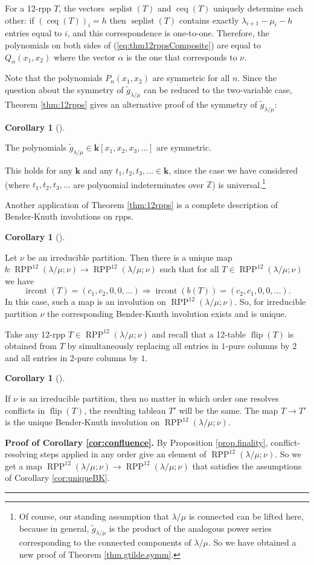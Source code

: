 \documentclass[numbers=enddot,12pt,final,onecolumn,notitlepage]{scrartcl}%
\theoremstyle{definition}
\newtheorem{coro}[theo]{Corollary}
\newenvironment{corollary}[1][]
{\begin{coro}[#1]\begin{leftbar}}
{\end{leftbar}\end{coro}}
\newenvironment{proof}[1][Proof]{\noindent\textbf{#1.} }{\ \rule{0.5em}{0.5em}}
\newcommand{\kk}{\mathbf{k}}
\def\seplist{{\operatorname*{seplist}}} %
\def\ceq{{\operatorname*{ceq}}}
\def\ircont{{\operatorname*{ircont}}}
\def\ceqvar{{{\alpha}}} %
\def\seplistvar{{{\nu}}} %
\def\g{{\widetilde{g}}}
\def\lm{{\lambda/\mu}}
\def\Z{\mathbb{Z}}
\def\OneTwoRPPCutvar{{\operatorname*{RPP}^{12}\left(  \lambda/\mu ;\seplistvar \right)}}
\def\flip{{\operatorname*{flip}}}
\begin{document}
 For a 12-rpp $T$, the vectors $\seplist(T)$ and $\ceq(T)$ uniquely determine each other: if $(\ceq(T))_i=h$ then $\seplist(T)$ contains exactly $\lambda_{i+1}-\mu_i-h$ entries equal to $i$, and this correspondence is one-to-one. Therefore, the polynomials on both sides of (\ref{eq:thm12rppsComposite}) are equal to $Q_{\ceqvar}(x_1,x_2)$ where the vector $\ceqvar$ is the one that corresponds to $\seplistvar$.

 Note that the polynomials $P_n(x_1,x_2)$ are symmetric for all $n$. Since the question about the symmetry of $\g_\lm$ can be reduced to the two-variable case, Theorem \ref{thm:12rpps} gives an alternative proof of the symmetry of $\g_\lm$:
\begin{corollary}
 The polynomials $\g_\lm \in \kk\left[x_1, x_2, x_3, \ldots\right]$ are symmetric.
\end{corollary}
 This holds for any $\kk$ and any $t_1, t_2, t_3, \ldots \in \kk$, since the case we have considered (where $t_1, t_2, t_3, \ldots$ are polynomial indeterminates over $\Z$) is universal.\footnote{Of course, our standing assumption that $\lm$ is connected can be lifted here, because in general, $\g_\lm$ is the product of the analogous power series corresponding to the connected components of $\lm$. So we have obtained a new proof of Theorem \ref{thm.gtilde.symm}.}

Another application of Theorem \ref{thm:12rpps} is a complete description of Bender-Knuth involutions on rpps.

\begin{corollary}
\label{cor:uniqueBK}
Let $\seplistvar$ be an irreducible partition. Then there is a unique map $b:\OneTwoRPPCutvar\to\OneTwoRPPCutvar$ such that for all $T\in\OneTwoRPPCutvar$ we have 
$$\ircont(T)=(c_1,c_2,0,0,\dots)\Longrightarrow \ircont(b(T))=(c_2,c_1,0,0,\dots).$$
In this case, such a map is an involution on $\OneTwoRPPCutvar$. So, for irreducible partition $\seplistvar$ the corresponding Bender-Knuth involution exists and is unique.
\end{corollary}

Take any 12-rpp $T\in\OneTwoRPPCutvar$ and recall that a 12-table $\flip(T)$ is obtained from $T$ by simultaneously replacing all entries in $1$-pure columns by $2$ and all entries in $2$-pure columns by $1$. 

\begin{corollary}
\label{cor:confluence}
 If $\seplistvar$ is an irreducible partition, then no matter in which order one resolves conflicts in $\flip(T)$, the resulting tableau $T'$ will be the same. The map $T\to T'$ is the unique Bender-Knuth involution on $\OneTwoRPPCutvar$.
\end{corollary}
\begin{proof}[Proof of Corollary \ref{cor:confluence}]
 By Proposition \ref{prop.finality}, conflict-resolving steps applied in any order give an element of $\OneTwoRPPCutvar$. So we get a map $\OneTwoRPPCutvar\to \OneTwoRPPCutvar$ that satisfies the assumptions of Corollary \ref{cor:uniqueBK}.
\end{proof}
\end{document}
